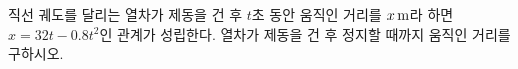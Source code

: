 직선 궤도를 달리는 열차가 제동을 건 후 $t$초 동안 움직인 거리를 $x\mkern3mu \mathrm{m}$라 하면 $x=32t-0.8t^2$인 관계가 성립한다. 열차가 제동을 건 후 정지할 때까지 움직인 거리를 구하시오.
